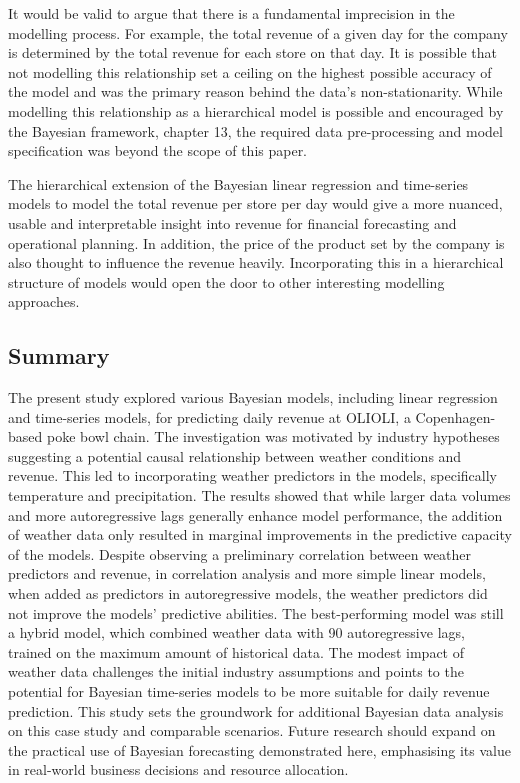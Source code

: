 It would be valid to argue that there is a fundamental imprecision in the
modelling process. For example, the total revenue of a given day for the
company is determined by the total revenue for each store on that day. It is
possible that not modelling this relationship set a ceiling on the highest
possible accuracy of the model and was the primary reason behind the data's
non-stationarity. While modelling this relationship as a hierarchical model is
possible and encouraged by the Bayesian framework, \cite{statrethinking}
chapter 13, the required data pre-processing and model specification was beyond
the scope of this paper.

The hierarchical extension of the Bayesian linear regression and time-series
models to model the total revenue per store per day would give a more nuanced,
usable and interpretable insight into revenue for financial forecasting and
operational planning. 
In addition, the price of the product set by the company is also thought to
influence the revenue heavily. Incorporating this in a hierarchical
structure of models would open the door to other interesting modelling
approaches.
\subsection{Summary}
The present study explored various Bayesian models, including linear regression
and time-series models, for predicting daily revenue at OLIOLI, a
Copenhagen-based poke bowl chain. The investigation was motivated by industry
hypotheses suggesting a potential causal relationship between weather
conditions and revenue. This led to incorporating weather predictors in the
models, specifically temperature and precipitation. The results showed that
while larger data volumes and more autoregressive lags generally enhance model
performance, the addition of weather data only resulted in marginal
improvements in the predictive capacity of the models. Despite observing a
preliminary correlation between weather predictors and revenue, in correlation
analysis and more simple linear models, when added as predictors in
autoregressive models, the weather predictors did not improve the models'
predictive abilities. The best-performing model was still a hybrid model, which
combined weather data with 90 autoregressive lags, trained on the maximum
amount of historical data. The modest impact of weather data challenges the
initial industry assumptions and points to the potential for Bayesian
time-series models to be more suitable for daily revenue prediction. This study
sets the groundwork for additional Bayesian data analysis on this case study
and comparable scenarios. Future research should expand on the practical use of
Bayesian forecasting demonstrated here, emphasising its value in real-world
business decisions and resource allocation.
